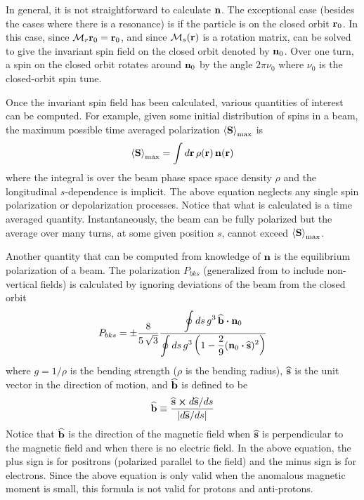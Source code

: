 In general, it is not straightforward to calculate ${\bf n}$. The exceptional case (besides the cases
where there is a resonance) is if the particle is on the closed orbit ${\bf r}_0$. In this case, since
${\cal M}_r {\bf r}_0 = {\bf r}_0$, and since ${\cal M}_s({\bf r})$ is a rotation matrix,  can be solved
to give the invariant spin field on the closed orbit denoted by ${\bf n}_0$.  Over one turn, a spin on
the closed orbit rotates around ${\bf n}_0$ by the angle $2 \pi \nu_0$ where $\nu_0$ is the
closed-orbit spin tune.

Once the invariant spin field has been calculated, various quantities of interest can be
computed. For example, given some initial distribution of spins in a beam, the maximum possible time
averaged polarization $\left< {\bf S} \right>_{\max}$ is
\begin{equation}
  \left< {\bf S} \right>_{\max} = \int d{\bf r} \, \rho({\bf r}) \, {\bf n}({\bf r})
\end{equation}
where the integral is over the beam phase space space density $\rho$ and the longitudinal
$s$-dependence is implicit. The above equation neglects any single spin polarization or
depolarization processes. Notice that what is calculated is a time averaged quantity.
Instantaneously, the beam can be fully polarized but the average over many turns, at some given
position $s$, cannot exceed $\left< {\bf S} \right>_{\max}$.

Another quantity that can be computed from knowledge of ${\bf n}$ is the equilibrium polarization of a
beam. The  polarization $P_{bks}$ (generalized from
 to include non-vertical fields) is calculated by ignoring deviations of the beam
from the closed orbit\cite{b:barber99}
\begin{equation}
  P_{bks} = \pm \frac{8}{5 \, \sqrt{3}}
  \frac{\displaystyle \oint ds \, g^3 \, \widehat{{\bf b}} \mathbin{\boldsymbol{\cdot}} {\bf n}_0}
  {\displaystyle \oint ds \, g^3 \left( 1 - \frac{2}{9} ({\bf n}_0 \mathbin{\boldsymbol{\cdot}} \widehat{{\bf s}})^2 \right)}
\end{equation}
where $g = 1/\rho$ is the bending strength ($\rho$ is the bending radius), $\widehat{{\bf s}}$ is the unit
vector in the direction of motion, and $\widehat{{\bf b}}$ is defined to be
\begin{equation}
  \widehat{{\bf b}} \equiv \frac{\widehat{{\bf s}} \mathbin{\boldsymbol{\times}} d\widehat{{\bf s}}/ds}{|d\widehat{{\bf s}}/ds|}
\end{equation}
Notice that $\widehat{{\bf b}}$ is the direction of the magnetic field when $\widehat{{\bf s}}$ is perpendicular to
the magnetic field and when there is no electric field. In the above equation, the plus sign is for
positrons (polarized parallel to the field) and the minus sign is for electrons. Since the above
equation is only valid when the anomalous magnetic moment is small\cite{b:jackson}, this formula is
not valid for protons and anti-protons.


